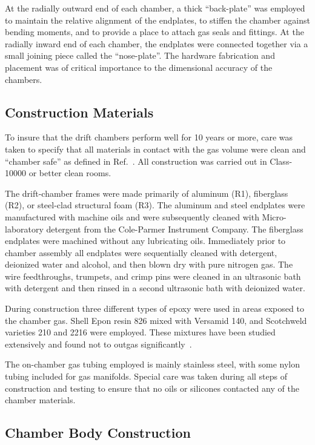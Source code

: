 At the radially outward end of each chamber, a thick ``back-plate'' was 
employed to maintain the relative 
alignment of the endplates, to stiffen the chamber against bending moments, 
and to provide a place to attach gas seals and fittings. At the radially inward 
end of each chamber, the endplates were connected together via a small joining 
piece called the ``nose-plate''.  The hardware fabrication and placement 
was of critical importance to the dimensional accuracy of the chambers.

\subsection{Construction Materials}
\label{materials}

To insure that the drift chambers perform well for 10 years or more, care was taken to 
specify that all materials in contact with the gas volume were clean and ``chamber 
safe'' as defined in Ref.~\cite{kadyk}.  All construction was carried out in 
Class-10000 or better clean rooms.

The drift-chamber frames were made primarily of aluminum (R1), fiberglass (R2),
or steel-clad structural foam (R3).  The aluminum and steel endplates were 
manufactured with machine oils and were subsequently cleaned with  
Micro-laboratory detergent from the Cole-Parmer Instrument Company.  The 
fiberglass endplates were machined without any lubricating oils.  Immediately 
prior to chamber assembly all endplates were sequentially cleaned with 
detergent,
deionized water and alcohol, and then blown dry with pure nitrogen gas.  The 
wire feedthroughs, trumpets, and crimp pins were cleaned in an ultrasonic bath 
with detergent and then rinsed in a second ultrasonic bath with deionized water.

During construction three different types of epoxy were used in areas exposed 
to the chamber gas.  Shell Epon resin 826 mixed with Versamid 140, and 
Scotchweld varieties 210 and 2216 were employed.  These mixtures have been 
studied extensively and found not to outgas significantly~\cite{nasa}.

The on-chamber gas tubing employed is mainly stainless steel, with some
nylon tubing included for gas manifolds.  Special care was taken during
all steps of construction and testing to ensure that no oils or
silicones contacted any of the chamber materials.

\subsection{Chamber Body Construction}

